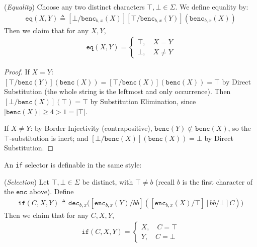 \documentclass[runningheads,envcountsect]{llncs}
\begin{document}
\begin{theorem}
    (\emph{Equality})
    Choose any two distinct characters $\top, \bot \in \Sigma$. We define equality by:
    \begin{align}
        \mathtt{eq}(X,Y) \triangleq [\bot/\mathtt{benc}_{b, x}(X)][\top/\mathtt{benc}_{b, x}(Y)](\mathtt{benc}_{b, x}(X))
    \end{align}
    Then we claim that for any $X,Y$,
    \begin{align}
        \mathtt{eq}(X,Y) = \begin{cases}
                               \top,\quad X=Y \\
                               \bot,\quad X\neq Y
                           \end{cases}
    \end{align}
\end{theorem}

\begin{proof}
    If $X = Y$: $[\top/\mathtt{benc}(Y)](\mathtt{benc}(X)) = [\top/\mathtt{benc}(X)](\mathtt{benc}(X)) = \top$ by Direct Substitution (the whole string is the leftmost and only occurrence). Then $[\bot/\mathtt{benc}(X)](\top) = \top$ by Substitution Elimination, since $|\mathtt{benc}(X)| \geq 4 > 1 = |\top|$.

    If $X \neq Y$: by Border Injectivity (contrapositive), $\mathtt{benc}(Y) \not\subset \mathtt{benc}(X)$, so the $\top$-substitution is inert; and $[\bot/\mathtt{benc}(X)](\mathtt{benc}(X)) = \bot$ by Direct Substitution.
\end{proof}

An \texttt{if} selector is definable in the same style:

\begin{theorem}
    (\emph{Selection})
    Let $\top, \bot \in \Sigma$ be distinct, with $\top \neq b$ (recall $b$ is the first character of the $\mathtt{enc}$ above). Define
    \begin{align}
        \mathtt{if}(C,X,Y) \triangleq \mathtt{dec}_{b,x}\big([\mathtt{enc}_{b, x}(Y)/bb]\left([\mathtt{enc}_{b, x}(X)/\top][bb/\bot]C\right)\big)
    \end{align}
    Then we claim that for any $C,X,Y$,
    \begin{align}
        \mathtt{if}(C,X,Y) = \begin{cases}
                               X,\quad C=\top \\
                               Y,\quad C=\bot
                           \end{cases}
    \end{align}
\end{theorem}
\end{document}
